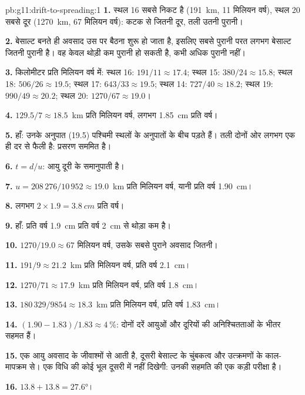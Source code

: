 \begin{solution}{pb:g11:drift-to-spreading:1}
\textbf{1.} स्थल 16 सबसे निकट है (\qty{191}{km}, 11 मिलियन वर्ष), स्थल 20
सबसे दूर (\qty{1270}{km}, 67 मिलियन वर्ष): कटक से जितनी दूर,
तली उतनी पुरानी।

\textbf{2.} बेसाल्ट बनते ही अवसाद उस पर बैठना शुरू हो जाता है,
इसलिए सबसे पुरानी परत लगभग बेसाल्ट जितनी पुरानी है। वह केवल
थोड़ी कम पुरानी हो सकती है, कभी अधिक पुरानी नहीं।

\textbf{3.} किलोमीटर प्रति मिलियन वर्ष में: स्थल 16: $191/11 \approx 17.4$;
स्थल 15: $380/24 \approx 15.8$; स्थल 18: $506/26 \approx 19.5$; स्थल 17:
$643/33 \approx 19.5$; स्थल 14: $727/40 \approx 18.2$; स्थल 19: $990/49
\approx 20.2$; स्थल 20: $1270/67 \approx 19.0$।

\textbf{4.} $129.5/7 \approx \num{18.5}$~km प्रति मिलियन वर्ष, लगभग
\qty{1.85}{cm} प्रति वर्ष।

\textbf{5.} हाँ: उनके अनुपात (19.5) पश्चिमी स्थलों के अनुपातों के बीच पड़ते हैं।
तली दोनों ओर लगभग एक ही दर से फैली है: प्रसरण
सममित है।

\textbf{6.} $t = d/u$: आयु दूरी के समानुपाती है।

\textbf{7.} $u = 208\,276/10\,952 \approx \num{19.0}$~km प्रति मिलियन वर्ष,
यानी प्रति वर्ष \qty{1.90}{cm}।

\textbf{8.} लगभग $2 \times 1.9 = \qty{3.8}{cm}$ प्रति वर्ष।

\textbf{9.} हाँ: प्रति वर्ष \qty{1.9}{cm} प्रति वर्ष \qty{2}{cm} से थोड़ा
कम है।

\textbf{10.} $1270/19.0 \approx 67$ मिलियन वर्ष, उसके सबसे पुराने
अवसाद जितनी।

\textbf{11.} $191/9 \approx \num{21.2}$~km प्रति मिलियन वर्ष,
प्रति वर्ष \qty{2.1}{cm}।

\textbf{12.} $1270/71 \approx \num{17.9}$~km प्रति मिलियन वर्ष,
प्रति वर्ष \qty{1.8}{cm}।

\textbf{13.} $180\,329/9854 \approx \num{18.3}$~km प्रति मिलियन वर्ष,
प्रति वर्ष \qty{1.83}{cm}।

\textbf{14.} $(1.90 - 1.83)/1.83 \approx \qty{4}{\percent}$: दोनों दरें
आयुओं और दूरियों की अनिश्चितताओं के भीतर सहमत हैं।

\textbf{15.} एक आयु अवसाद के जीवाश्मों से आती है, दूसरी बेसाल्ट के
चुंबकत्व और उत्क्रमणों के काल-मापक्रम से। एक विधि की कोई भूल
दूसरी में नहीं दिखेगी: उनकी सहमति  की
एक कड़ी परीक्षा है।

\textbf{16.} $13.8 + 13.8 = \ang{27.6}$।


\end{solution}
